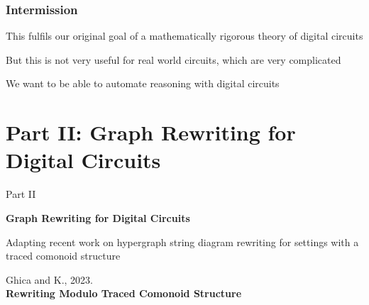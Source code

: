 \begin{frame}
    \frametitle{Intermission}

    \centering
    \Large

    \pause

    This fulfils our \alert{original goal} of a mathematically rigorous
    theory of digital circuits

    \pause
    \vspace{1em}

    But this is not very useful for \alert{real world} circuits, which are
    very complicated

    \pause
    \vspace{1em}

    We want to be able to \alert{automate} reasoning with digital circuits

\end{frame}

\section{Part II: Graph Rewriting for Digital Circuits}

\begin{frame}

    \Huge
    \centering

    Part II

    \textbf{Graph Rewriting for Digital Circuits}

    \Large
    \vspace{0.25em}

    Adapting recent work on \alert{hypergraph string diagram rewriting} for
    settings with a \alert{traced comonoid} structure

    \large
    \vspace{0.5em}

    \pause

    Ghica and K., 2023. \\
    \textbf{Rewriting Modulo Traced Comonoid Structure}

\end{frame}

